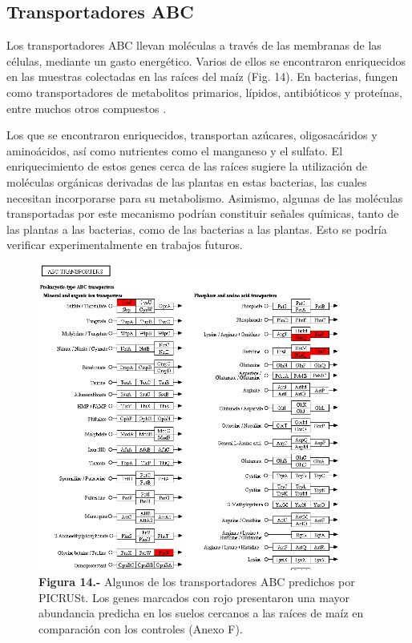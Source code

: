 \documentclass[12pt,letterpaper,oneside]{report}
\begin{document}
\subsection{Transportadores ABC}
Los transportadores ABC llevan moléculas a través de las membranas de las células, mediante un gasto energético. Varios de ellos se encontraron enriquecidos en las muestras colectadas en las raíces del maíz (Fig. 14). En bacterias, fungen como transportadores de metabolitos primarios, lípidos, antibióticos y proteínas, entre muchos otros compuestos \autocite{Kang2011}.
\par
Los que se encontraron enriquecidos, transportan azúcares, oligosacáridos y aminoácidos, así como nutrientes como el manganeso y el sulfato. El enriquecimiento de estos genes cerca de las raíces sugiere la utilización de moléculas orgánicas derivadas de las plantas en estas bacterias, las cuales necesitan incorporarse para su metabolismo. Asimismo, algunas de las moléculas transportadas por este mecanismo podrían constituir señales químicas, tanto de las plantas a las bacterias, como de las bacterias a las plantas. Esto se podría verificar experimentalmente en trabajos futuros.
\begin{figure}[!h]
\centering
\includegraphics[width=10cm]{figuras/IMG_15}
\caption*{\textbf{Figura 14.-} Algunos de los transportadores ABC predichos por PICRUSt. Los genes marcados con rojo presentaron una mayor abundancia predicha en los suelos cercanos a las raíces de maíz en comparación con los controles (Anexo F).}
\label{Figura 15}
\end{figure}
\newpage
\end{document}
